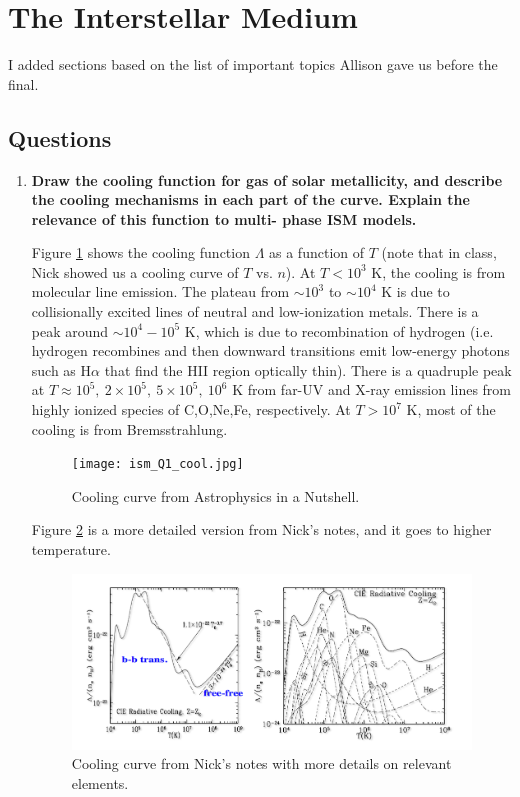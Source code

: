 \section{The Interstellar Medium}

I added sections based on the list of important topics Allison gave us 
before the final. 

\subsection{Questions}
\begin{enumerate}
\item \textbf{Draw the cooling function for gas of solar metallicity, and describe the cooling
      mechanisms in each part of the curve. Explain the relevance of this function to multi-
      phase ISM models.}
      
      Figure \ref{f:cool1} shows the cooling function $\Lambda$ as a function of $T$ (note that in class, Nick showed us a cooling curve of $T$ vs. $n$). At $T < 10^3$ K, the cooling is from molecular line emission. The plateau from $\sim10^3$ to $\sim10^4$ K is due to collisionally excited lines of neutral and low-ionization metals. There is a peak around $\sim10^4-10^5$ K, which is due to recombination of hydrogen (i.e. hydrogen recombines and then downward transitions emit low-energy photons such as H$\alpha$ that find the HII region optically thin). There is a quadruple peak at $T \approx 10^5,~2\times 10^5,~5\times 10^5,~10^6$ K from far-UV and X-ray emission lines from highly ionized species of C,O,Ne,Fe, respectively. At $T > 10^7$ K, most of the cooling is from Bremsstrahlung.
      
      \begin{figure}[ht]
      \begin{center}
      \texttt{[image: ism\_Q1\_cool.jpg]}
      \end{center}
      \caption{Cooling curve from Astrophysics in a Nutshell. \label{f:cool1}}
	  \end{figure}
	
	  Figure \ref{f:cool2} is a more detailed version from Nick's notes, and it goes to higher temperature.
	
	  \begin{figure}[ht]
      \begin{center}
      \includegraphics[width=\textwidth]{ism_Q1_cool_b.jpg}
      \end{center}
      \caption{Cooling curve from Nick's notes with more details on relevant elements. \label{f:cool2}}
      \end{figure}


\end{enumerate}
